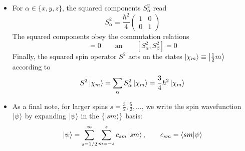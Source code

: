 \documentclass[11pt, a4paper]{article}
\newcommand{\eqtext}[1]{\qquad \text{#1} \qquad}
\newcommand{\p}{\psi}  %
\begin{document}
\begin{itemize}
	
	\item For $ \alpha \in \{x, y, z\} $, the squared components $ S_{\alpha}^{2} $ read
	\begin{equation*}
		S_{\alpha}^{2} = \frac{\hbar^{2}}{4}
		\begin{pmatrix}
			1 & 0\\
			0 & 1
		\end{pmatrix}
	\end{equation*}
	The squared components obey the commutation relations
	\begin{equation*}
		[S_{\alpha}, S_{\beta}^{2}] = 0 \eqtext{an} [S_{\alpha}^{2}, S_{\beta}^{2}] = 0
	\end{equation*}
	Finally, the squared spin operator $ S^{2} $ acts on the states $ \ket{\chi_{m}} \equiv \ket{\tfrac{1}{2}m} $ according to
	\begin{equation*}
		S^{2}\ket{\chi_{m}} = \sum_{\alpha}S_{\alpha}^{2} \ket{\chi_{m}} = \frac{3}{4}\hbar^{2} \ket{\chi_{m}}
	\end{equation*}
	
	\item As a final note, for larger spins $ s = \frac{3}{2}, \frac{5}{2}, \ldots $, we write the spin wavefunction $ \ket{\p} $ by expanding $ \ket{\p} $ in the $ \{\ket{sm}\} $ basis:
	\begin{equation*}
		\ket{\p} = \sum_{s = 1/2}^{\infty}\sum_{m = -s}^{s}c_{sm}\ket{sm}, \qquad c_{sm} = \braket{sm}{\psi}
	\end{equation*}
	
\end{itemize}
\end{document}

